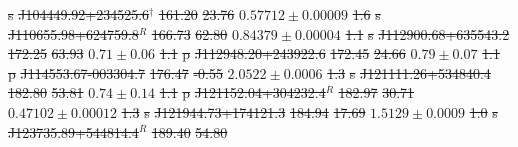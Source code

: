 \documentclass[11pt, a4paper]{book}
\providecommand{\DIFdeltex}[1]{{\protect\color{red}\sout{#1}}}                      %
\providecommand{\DIFdelFL}[1]{\DIFdel{#1}} %
\providecommand{\DIFdel}[1]{\texorpdfstring{\DIFdeltex{#1}}{}} %
\begin{document}
\DIFdelFL{s}%
    \DIFdelFL{J104449.92+234525.6${}^\dagger$ }%
\DIFdelFL{161.20 }%
\DIFdelFL{23.76 }%
\DIFdelFL{$0.57712 \pm 0.00009$ }%
\DIFdelFL{1.6 }%
\DIFdelFL{s}%
    \DIFdelFL{J110655.98+624759.8${}^R$ }%
\DIFdelFL{166.73 }%
\DIFdelFL{62.80 }%
\DIFdelFL{$0.84379 \pm 0.00004$ }%
\DIFdelFL{1.1 }%
\DIFdelFL{s}%
    \DIFdelFL{J112900.68+635543.2 }%
\DIFdelFL{172.25 }%
\DIFdelFL{63.93 }%
\DIFdelFL{$0.71 \pm 0.06$ }%
\DIFdelFL{1.1 }%
\DIFdelFL{p}%
    \DIFdelFL{J112948.20+243922.6 }%
\DIFdelFL{172.45 }%
\DIFdelFL{24.66 }%
\DIFdelFL{$0.79 \pm 0.07$ }%
\DIFdelFL{1.1 }%
\DIFdelFL{p}%
    \DIFdelFL{J114553.67-003304.7 }%
\DIFdelFL{176.47 }%
\DIFdelFL{-0.55 }%
\DIFdelFL{$2.0522 \pm 0.0006$ }%
\DIFdelFL{1.3 }%
\DIFdelFL{s}%
    \DIFdelFL{J121111.26+534840.4 }%
\DIFdelFL{182.80 }%
\DIFdelFL{53.81 }%
\DIFdelFL{$0.74 \pm 0.14$ }%
\DIFdelFL{1.1 }%
\DIFdelFL{p}%
    \DIFdelFL{J121152.04+304232.4${}^R$ }%
\DIFdelFL{182.97 }%
\DIFdelFL{30.71 }%
\DIFdelFL{$0.47102 \pm 0.00012$ }%
\DIFdelFL{1.3 }%
\DIFdelFL{s}%
    \DIFdelFL{J121944.73+174121.3 }%
\DIFdelFL{184.94 }%
\DIFdelFL{17.69 }%
\DIFdelFL{$1.5129 \pm 0.0009$ }%
\DIFdelFL{1.0 }%
\DIFdelFL{s}%
    \DIFdelFL{J123735.89+544814.4${}^R$ }%
\DIFdelFL{189.40 }%
\DIFdelFL{54.80 }%
\end{document}
